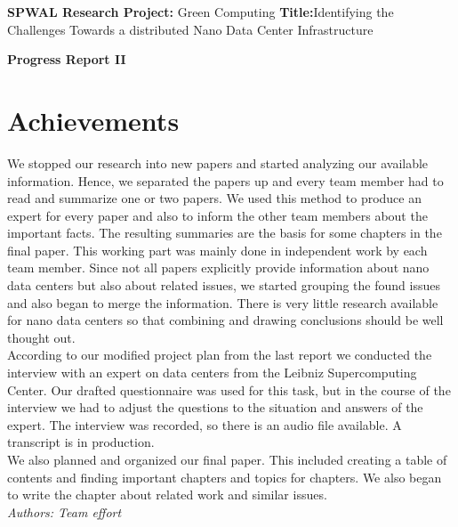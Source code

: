 \documentclass[sigchi-a, authorversion]{acmart}
\begin{document}
\begin{sidebar}
  \textbf{SPWAL Research Project:} Green Computing
  \textbf{Title:}Identifying the Challenges Towards a distributed Nano Data Center Infrastructure

  \textbf{Progress Report II}
\end{sidebar}


\section{Achievements}
\label{sec:achievements}
We stopped our research into new papers and started analyzing our available information. Hence, we separated the papers up and every team member had to read and summarize one or two papers. We used this method to produce an expert for every paper and also to inform the other team members about the important facts. The resulting summaries are the basis for some chapters in the final paper. This working part was mainly done in independent work by each team member. Since not all papers explicitly provide information about nano data centers but also about related issues, we started grouping the found issues and also began to merge the information. There is very little research available for nano data centers so that combining and drawing conclusions should be well thought out.\\  
According to our modified project plan from the last report we conducted the interview with an expert on data centers from the Leibniz Supercomputing Center. Our drafted questionnaire was used for this task, but in the course of the interview we had to adjust the questions to the situation and answers of the expert. The interview was recorded, so there is an audio file available. A transcript is in production.\\
We also planned and organized our final paper. This included creating a table of contents and finding important chapters and topics for chapters. We also began to write the chapter about related work and similar issues.\\
\textit{Authors: Team effort}\\
\end{document}
